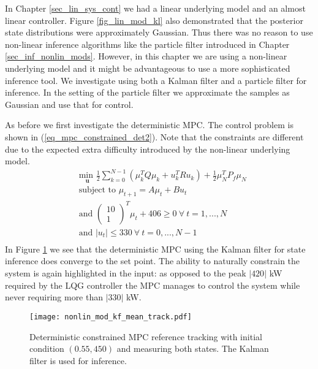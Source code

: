In Chapter \ref{sec_lin_sys_cont} we had a linear underlying model and an almost linear controller. Figure \ref{fig_lin_mod_kl} also demonstrated that the posterior state distributions were approximately Gaussian. Thus there was no reason to use non-linear inference algorithms like the particle filter introduced in Chapter \ref{sec_inf_nonlin_mods}. However, in this chapter we are using a non-linear underlying model and it might be advantageous to use a more sophisticated inference tool. We investigate using both a Kalman filter and a particle filter for inference. In the setting of the particle filter we approximate the samples as Gaussian and use that for control.

As before we first investigate the deterministic MPC. The control problem is shown in (\ref{eq_mpc_constrained_det2}). Note that the constraints are different due to the expected extra difficulty introduced by the non-linear underlying model. 
\begin{equation}
\begin{aligned}
&\underset{\mathbf{u}}{\text{min }} \frac{1}{2}\sum_{k=0}^{N-1} \left( \mu_k^TQ\mu_k + u_k^TRu_k \right) + \frac{1}{2}\mu_N^TP_f\mu_N \\
& \text{subject to } \mu_{t+1}=A\mu_t + Bu_t \\
&\text{and } \begin{pmatrix}
10 \\ 1
\end{pmatrix}^T \mu_t + 406 \geq 0 ~\forall ~t=1,...,N\\
& \text{and } |u_t| \leq 330 ~\forall ~t=0,...,N-1\\
\end{aligned}
\label{eq_mpc_constrained_det2}
\end{equation}
In Figure \ref{fig_nonlin_mod_kf_mean_track} we see that the deterministic MPC using the Kalman filter for state inference does converge to the set point. The ability to naturally constrain the system is again highlighted in the input: as opposed to the peak $|420|$ kW required by the LQG controller the MPC manages to control the system while never requiring more than $|330|$ kW. 
\begin{figure}[H] 
\centering
\texttt{[image: nonlin\_mod\_kf\_mean\_track.pdf]}
\caption{Deterministic constrained MPC reference tracking with initial condition $(0.55, 450)$ and measuring both states. The Kalman filter is used for inference.}
\label{fig_nonlin_mod_kf_mean_track}
\end{figure} 
